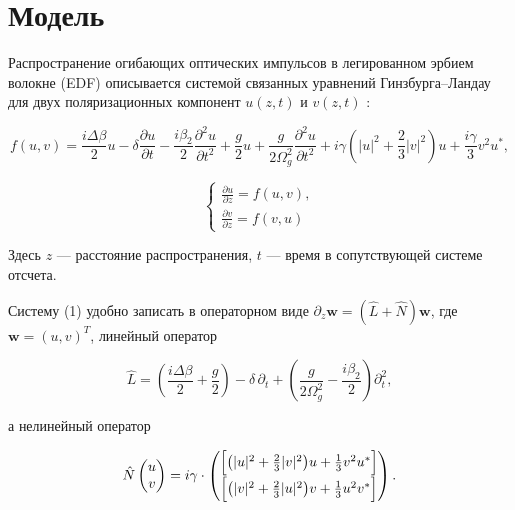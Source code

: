 \documentclass{article}
\begin{document}
\section{Модель}

Распространение огибающих оптических импульсов в легированном эрбием волокне (EDF) описывается системой связанных уравнений Гинзбурга–Ландау для двух поляризационных компонент \(u(z,t)\) и \(v(z,t)\) \cite{main}:

\begin{equation}
    f(u, v) = \frac{i\Delta\beta}{2}u - \delta\frac{\partial u}{\partial t} - \frac{i\beta_2}{2}\frac{\partial^2 u}{\partial t^2} +
    \frac{g}{2}u + \frac{g}{2\Omega_g^2}\frac{\partial^2 u}{\partial t^2} +
    i\gamma\left(|u|^2 + \frac{2}{3}|v|^2\right)u + \frac{i\gamma}{3}v^2 u^*,
\end{equation}

\begin{equation}
    \begin{cases}
        \frac{\partial u}{\partial z} = f(u, v), \\
        \frac{\partial v}{\partial z} = f(v, u)
    \end{cases}
\end{equation}

Здесь \(z\) --- расстояние распространения, \(t\) --- время в сопутствующей системе отсчета.

Систему (1) удобно записать в операторном виде \(\partial_z \mathbf{w} = (\hat L + \hat N)\mathbf{w}\), где \(\mathbf{w}=(u,v)^T\), линейный оператор

\begin{equation}
    \hat L = \left(\frac{i\Delta\beta}{2} + \frac{g}{2}\right) - \delta\,\partial_t + \left(\frac{g}{2\Omega_g^2} - \frac{i\beta_2}{2}\right)\partial_t^2,
\end{equation}

а нелинейный оператор

\begin{equation}\label{eq:nonlin_ode}
    \hat N\begin{pmatrix}u\\v\end{pmatrix} =
    i\gamma \cdot \begin{pmatrix}
        \Bigl[\bigl(|u|^2+\tfrac{2}{3}|v|^2\bigr)u + \tfrac{1}{3}v^2 u^*\Bigr] \\[4pt]
        \Bigl[\bigl(|v|^2+\tfrac{2}{3}|u|^2\bigr)v + \tfrac{1}{3}u^2 v^*\Bigr]
    \end{pmatrix}.
\end{equation}
\end{document}
